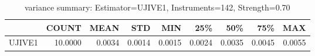 \begin{table}[ht]
\centering
\caption{variance summary: Estimator=UJIVE1, Instruments=142, Strength=0.70}
\begin{tabular}{lrrrrrrrr}
\toprule
 & COUNT & MEAN & STD & MIN & 25\% & 50\% & 75\% & MAX \\
\midrule
UJIVE1 & 10.0000 & 0.0034 & 0.0014 & 0.0015 & 0.0024 & 0.0035 & 0.0045 & 0.0055 \\
\bottomrule
\end{tabular}
\end{table}
